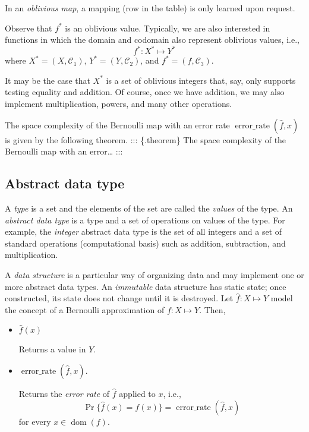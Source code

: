 \documentclass[
]{article}
\theoremstyle{definition}
\theoremstyle{definition}
\theoremstyle{definition}
\theoremstyle{definition}
\theoremstyle{remark}
\begin{document}
In an \emph{oblivious map}, a mapping (row in the table) is only learned upon request.

Observe that \(f^*\) is an oblivious value. Typically, we are also interested in
functions in which the domain and codomain also represent oblivious values, i.e.,
\[
f^* : X^* \mapsto Y^*
\]
where \(X^* = (X,\mathcal{C}_1)\), \(Y^* = (Y,\mathcal{C}_2)\), and \(f^* = (f,\mathcal{C}_3)\).

It may be the case that \(X^*\) is a set of oblivious integers that, say, only
supports testing equality and addition. Of course, once we have addition, we may
also implement multiplication, powers, and many other operations.

The space complexity of the Bernoulli map with an error
rate \(\operatorname{error\_rate}(\hat{f}, x)\) is given by the following theorem.
::: \{.theorem\}
The space complexity of the Bernoulli map with an error\ldots{}
:::

\hypertarget{abstract-data-type}{%
\subsection{Abstract data type}\label{abstract-data-type}}

A \emph{type} is a set and the elements of the set are called the \emph{values} of the
type.
An \emph{abstract data type} is a type and a set of operations on values of the type.
For example, the \emph{integer} abstract data type is the set of all integers and a
set of standard operations (computational basis) such as addition, subtraction,
and multiplication.

A \emph{data structure} is a particular way of organizing data and may implement one
or more abstract data types.
An \emph{immutable} data structure has static state; once constructed, its state does
not change until it is destroyed.
Let \(\hat{f} : X \mapsto Y\) model the concept of a Bernoulli approximation of
\(f : X \mapsto Y\).
Then,

\begin{itemize}
\item
  \(\hat{f}(x)\)

  Returns a value in \(Y\).
\item
  \(\operatorname{error\_rate}(\hat{f},x)\).

  Returns the \emph{error rate} of \(\hat{f}\) applied to \(x\), i.e.,
  \[
      \Pr\{\hat{f}(x) = f(x)\} = \operatorname{error\_rate}(\hat{f},x)
  \]
  for every \(x \in \operatorname{dom}(f)\).
\end{itemize}
\end{document}
